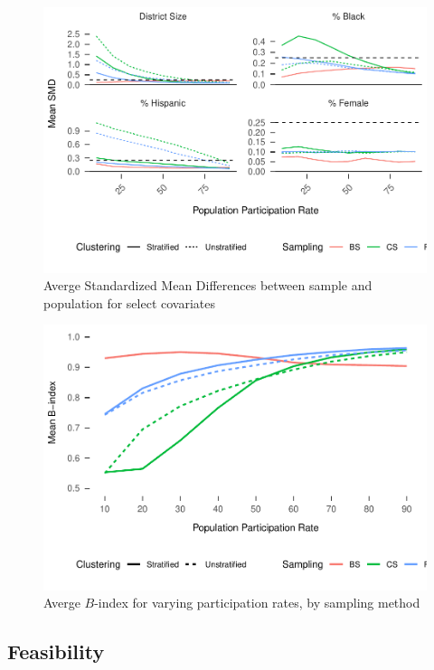 \documentclass[man,floatsintext]{apa6}
\begin{document}
\begin{figure}
\centering
\includegraphics{GenSamp-Paper_files/figure-latex/fig-SMD-by-Var-example-1.pdf}
\caption{\label{fig:fig-SMD-by-Var-example}Averge Standardized Mean Differences between sample and population for select covariates}
\end{figure}



\begin{figure}
\centering
\includegraphics{GenSamp-Paper_files/figure-latex/fig-avg-Bindex-1.pdf}
\caption{\label{fig:fig-avg-Bindex}Averge \(B\)-index for varying participation rates, by sampling method}
\end{figure}

\hypertarget{feasibility-1}{%
\subsection{Feasibility}\label{feasibility-1}}
\end{document}
